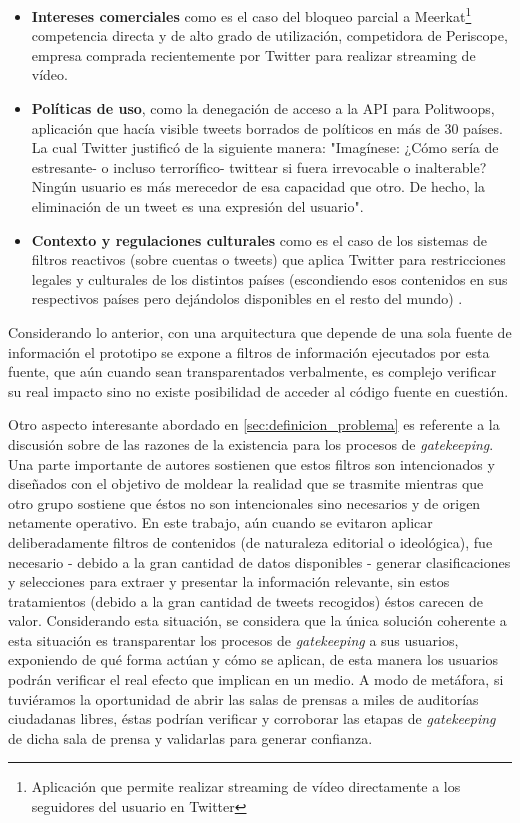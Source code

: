 \begin{itemize}
	\item \textbf{Intereses comerciales} como es el caso del bloqueo parcial a 
		Meerkat\footnote{Aplicación que permite realizar streaming de vídeo directamente a los seguidores del usuario en Twitter} competencia directa y de alto grado de utilización, competidora de Periscope, empresa comprada recientemente por Twitter para realizar streaming de vídeo. 
	\item \textbf{Políticas de uso}, como la denegación de acceso a la API para 
		Politwoops\cite{Diplotwoops:Online}, aplicación que hacía visible tweets borrados de políticos en más de 30 países. La cual Twitter justificó de la siguiente manera: "Imagínese: ¿Cómo sería de estresante- o incluso terrorífico-  twittear si fuera irrevocable o inalterable? Ningún usuario es más merecedor de esa capacidad que otro. De hecho, la eliminación de un tweet es una expresión del usuario".
	\item \textbf{Contexto y regulaciones culturales} como es el caso de los sistemas de filtros reactivos (sobre cuentas o tweets) que aplica Twitter para restricciones legales y culturales de los distintos países (escondiendo esos contenidos en sus respectivos países pero dejándolos disponibles en el resto del mundo) \cite{tweetsStillMustFlow}.
\end{itemize}

Considerando lo anterior, con una arquitectura que depende de una sola fuente de información el prototipo se expone a filtros de información ejecutados por esta fuente, que aún cuando sean transparentados verbalmente, es complejo verificar su real impacto sino no existe posibilidad de acceder al código fuente en cuestión. 

Otro aspecto interesante abordado en \ref{sec:definicion_problema} es referente a la discusión sobre de las razones de la existencia para los procesos de \emph{gatekeeping}. Una parte importante de autores sostienen que estos filtros son intencionados y diseñados con el objetivo de moldear la realidad que se trasmite mientras que otro grupo sostiene que éstos no son intencionales sino necesarios y de origen netamente operativo. En este trabajo, aún cuando se evitaron aplicar deliberadamente filtros de contenidos (de naturaleza editorial o ideológica), fue necesario - debido a la gran cantidad de datos disponibles - generar clasificaciones y selecciones para extraer y presentar la información relevante, sin estos tratamientos (debido a la gran cantidad de tweets recogidos) éstos carecen de valor. Considerando esta situación, se considera que la única solución coherente a esta situación es transparentar los procesos de \emph{gatekeeping} a sus usuarios, exponiendo de qué forma actúan y cómo se aplican, de esta manera los usuarios podrán verificar el real efecto que implican en un medio. A modo de metáfora, si tuviéramos la oportunidad de abrir las salas de prensas a miles de auditorías ciudadanas libres, éstas podrían verificar y corroborar las etapas de \emph{gatekeeping} de dicha sala de prensa y validarlas para generar confianza.

